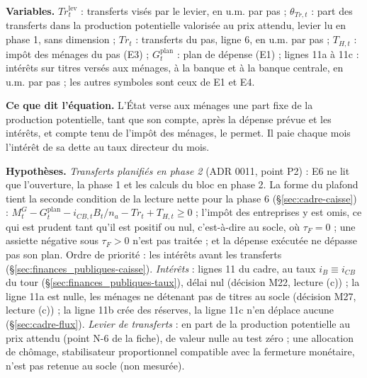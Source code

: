 \documentclass[11pt,a4paper]{article}
\newcommand{\variables}{\par\noindent\textbf{Variables.} }
\newcommand{\sens}{\par\noindent\textbf{Ce que dit l'équation.} }
\newcommand{\hyp}{\par\noindent\textbf{Hypothèses.} }
\begin{document}
\begin{proposee}
\variables $\mathit{Tr}^{\mathrm{lev}}_t$ : transferts visés par le levier, en u.m. par pas ; $\theta_{\mathit{Tr},t}$ : part des transferts dans la production potentielle valorisée au prix attendu, levier lu en phase 1, sans dimension ; $\mathit{Tr}_t$ : transferts du pas, ligne 6, en u.m. par pas ; $T_{H,t}$ : impôt des ménages du pas (E3) ; $G^{\mathrm{plan}}_t$ : plan de dépense (E1) ; lignes 11a à 11c : intérêts sur titres versés aux ménages, à la banque et à la banque centrale, en u.m. par pas ; les autres symboles sont ceux de E1 et E4.
\sens L'État verse aux ménages une part fixe de la production potentielle, tant que son compte, après la dépense prévue et les intérêts, et compte tenu de l'impôt des ménages, le permet. Il paie chaque mois l'intérêt de sa dette au taux directeur du mois.
\hyp \emph{Transferts planifiés en phase 2} (ADR 0011, point P2) : E6 ne lit que l'ouverture, la phase 1 et les calculs du bloc en phase 2. La forme du plafond tient la seconde condition de la lecture nette pour la phase 6 (\S\ref{sec:cadre-caisse}) : $M^G_t - G^{\mathrm{plan}}_t - i_{\mathit{CB},t}B_t/n_a - \mathit{Tr}_t + T_{H,t} \ge 0$ ; l'impôt des entreprises y est omis, ce qui est prudent tant qu'il est positif ou nul, c'est-à-dire au socle, où $\tau_F = 0$ ; une assiette négative sous $\tau_F > 0$ n'est pas traitée ; et la dépense exécutée ne dépasse pas son plan. Ordre de priorité : les intérêts avant les transferts (\S\ref{sec:finances_publiques-caisse}). \emph{Intérêts} : lignes 11 du cadre, au taux $i_B \equiv i_{\mathit{CB}}$ du tour (\S\ref{sec:finances_publiques-taux}), délai nul (décision M22, lecture (c)) ; la ligne 11a est nulle, les ménages ne détenant pas de titres au socle (décision M27, lecture (c)) ; la ligne 11b crée des réserves, la ligne 11c n'en déplace aucune (\S\ref{sec:cadre-flux}). \emph{Levier de transferts} : en part de la production potentielle au prix attendu (point N-6 de la fiche), de valeur nulle au test zéro ; une allocation de chômage, stabilisateur proportionnel compatible avec la fermeture monétaire, n'est pas retenue au socle (non mesurée).

\end{proposee}
\end{document}
